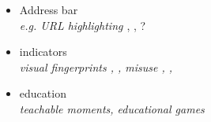 

\begin{itemize}
\item Address bar\\
\emph{e.g. URL highlighting \cite{lin2007}}, \cite{Krammer:2006:PDA:1501434.1501473, gabrilovich2002homograph}, ? \cite{iphone}

\item indicators\\
\emph{visual fingerprints \cite{dhamija2005battle, visualisation},
\cite{indicators}, misuse \cite{misuse}, \cite{emperor}, \cite{amrutkar2012measuring}}



\item education\\
\emph{teachable moments, educational games \cite{TUD-CS-2013-0167, kumaraguru2007protecting, alnajim2009antiphishing, embedded2011jansson, sheng2007antiphishingphil, intervention, 404,johnny}}


\end{itemize}
